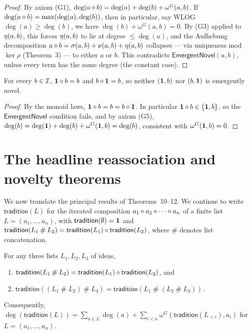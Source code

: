 \begin{proof}
By axiom (G1), $\deg(a\mathbin{\diamond} b) = \deg(a) + \deg(b) + \omega^G(a,b)$.
If $\deg(a\mathbin{\diamond} b) = \max(\deg(a),\deg(b))$, then in particular,
say WLOG $\deg(a) \ge \deg(b)$, we have $\deg(b) + \omega^G(a,b) = 0$.
By (G3) applied to $\eta(a,b)$, this forces
$\eta(a,b)$ to lie at degree $\le \deg(a)$, and the Aufhebung
decomposition $a\mathbin{\diamond} b = \sigma(a,b) + \nu(a,b) +
\eta(a,b)$ collapses --- via uniqueness mod $\ker\rho$
(Theorem~3) --- to either $a$ or $b$. This contradicts
$\mathsf{EmergentNovel}(a,b)$, unless every term has the same degree
(the constant case).
\end{proof}

\begin{lemma}
\label{lem:identity-not-novel}
For every $b\in\mathcal{I}$, $\mathbf{1}\mathbin{\diamond} b = b$ and $b\mathbin{\diamond}\mathbf{1} = b$,
so neither $(\mathbf{1}, b)$ nor $(b, \mathbf{1})$ is emergently novel.
\end{lemma}

\begin{proof}
By the monoid laws, $\mathbf{1}\mathbin{\diamond} b = b = b\mathbin{\diamond}\mathbf{1}$. In
particular $\mathbf{1}\mathbin{\diamond} b \in \{\mathbf{1}, b\}$, so the
$\mathsf{EmergentNovel}$ condition fails, and by axiom (G5), $\deg(b) =
\deg(\mathbf{1}) + \deg(b) + \omega^G(\mathbf{1},b) = \deg(b)$, consistent with
$\omega^G(\mathbf{1},b) = 0$.
\end{proof}

\section{The headline reassociation and novelty theorems}
\label{sec:headline}

We now translate the principal results of Theorems~10--12. We continue
to write $\mathsf{tradition}(L)$ for the iterated composition
$a_1\mathbin{\diamond} a_2\mathbin{\diamond} \cdots\mathbin{\diamond} a_n$ of a finite list $L =
(a_1,\dots,a_n)$, with $\mathsf{tradition}(\emptyset) = \mathbf{1}$ and
$\mathsf{tradition}(L_1 \mathbin{\#} L_2) = \mathsf{tradition}(L_1)
\mathbin{\diamond} \mathsf{tradition}(L_2)$, where $\mathbin{\#}$ denotes list
concatenation.

\begin{theorem}
\label{thm:reassociation}
For any three lists $L_1, L_2, L_3$ of ideas,
\begin{enumerate}
\item[(i)] $\mathsf{tradition}(L_1 \mathbin{\#} L_2) =
  \mathsf{tradition}(L_1) \mathbin{\diamond} \mathsf{tradition}(L_2)$, and
\item[(ii)] $\mathsf{tradition}((L_1 \mathbin{\#} L_2) \mathbin{\#} L_3)
  = \mathsf{tradition}(L_1 \mathbin{\#} (L_2 \mathbin{\#} L_3))$.
\end{enumerate}
Consequently, $\deg(\mathsf{tradition}(L)) = \sum_{a\in L} \deg(a) +
\sum_{i<n} \omega^G(\mathsf{tradition}(L_{<i}), a_i)$ for $L =
(a_1,\dots,a_n)$.
\end{theorem}

